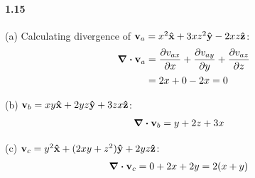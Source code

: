 \documentclass[../main.tex]{subfiles}
\begin{document}
\paragraph{1.15}
(a) Calculating divergence of $\vb v_a = x^2\vu{x} + 3xz^2\vu{y} - 2xz\vu{z}$:
\begin{align*}
    \div{\vb v_a} &= \pdv{v_{ax}}{x} + \pdv{v_{ay}}{y} + \pdv{v_{az}}{z} \\
    &= 2x + 0 - 2x = 0
\end{align*}

(b) $\vb v_b = xy\vu{x} + 2yz\vu{y} + 3zx\vu{z}$:
\begin{align*}
    \div{\vb v_b} &= y + 2z + 3x
\end{align*}

(c) $\vb v_c = y^2\vu{x} + (2xy + z^2)\vu{y} + 2yz\vu{z}$:
\begin{align*}
    \div{\vb v_c} &= 0 + 2x + 2y = 2(x + y)
\end{align*}
\end{document}

